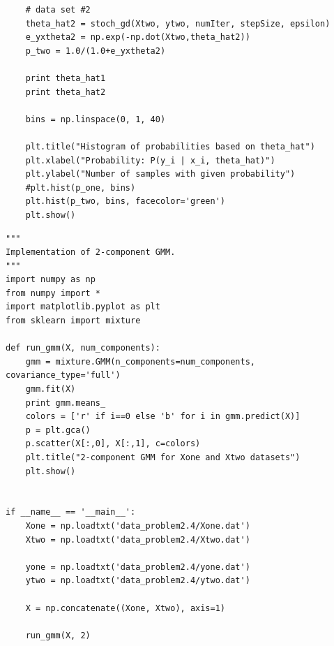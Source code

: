 \documentclass[11pt]{article}
\begin{document}
\begin{lstlisting}
    # data set #2
    theta_hat2 = stoch_gd(Xtwo, ytwo, numIter, stepSize, epsilon)
    e_yxtheta2 = np.exp(-np.dot(Xtwo,theta_hat2))
    p_two = 1.0/(1.0+e_yxtheta2)

    print theta_hat1
    print theta_hat2

    bins = np.linspace(0, 1, 40)

    plt.title("Histogram of probabilities based on theta_hat")
    plt.xlabel("Probability: P(y_i | x_i, theta_hat)")
    plt.ylabel("Number of samples with given probability")
    #plt.hist(p_one, bins)
    plt.hist(p_two, bins, facecolor='green')
    plt.show()
\end{lstlisting}

\begin{lstlisting}
"""
Implementation of 2-component GMM.
"""
import numpy as np
from numpy import *
import matplotlib.pyplot as plt
from sklearn import mixture

def run_gmm(X, num_components):
    gmm = mixture.GMM(n_components=num_components, covariance_type='full')
    gmm.fit(X)
    print gmm.means_
    colors = ['r' if i==0 else 'b' for i in gmm.predict(X)]
    p = plt.gca()
    p.scatter(X[:,0], X[:,1], c=colors)
    plt.title("2-component GMM for Xone and Xtwo datasets")
    plt.show()


if __name__ == '__main__':
    Xone = np.loadtxt('data_problem2.4/Xone.dat')
    Xtwo = np.loadtxt('data_problem2.4/Xtwo.dat')

    yone = np.loadtxt('data_problem2.4/yone.dat')
    ytwo = np.loadtxt('data_problem2.4/ytwo.dat')

    X = np.concatenate((Xone, Xtwo), axis=1)

    run_gmm(X, 2)
\end{lstlisting}
\end{document}
